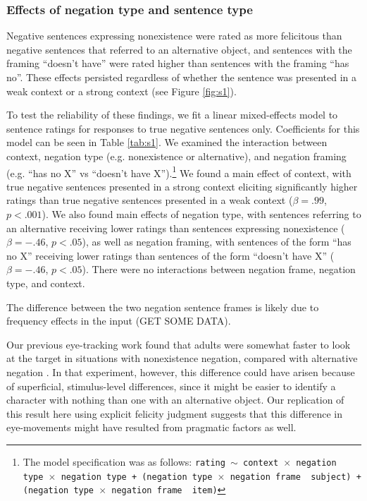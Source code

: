 \documentclass[10pt,letterpaper]{article}
\begin{document}
\subsubsection{Effects of negation type and sentence type}

Negative sentences expressing nonexistence were rated as more felicitous than negative sentences that referred to an alternative object, and sentences with the framing ``doesn't have'' were rated higher than sentences with the framing ``has no''.  These effects persisted regardless of whether the sentence was presented in a weak context or a strong context (see Figure \ref{fig:s1}).  

To test the reliability of these findings, we fit a linear mixed-effects model to sentence ratings for responses to true negative sentences only.  Coefficients for this model can be seen in Table \ref{tab:s1}.  We examined the interaction between context, negation type (e.g. nonexistence or alternative), and negation framing (e.g. ``has no X'' vs ``doesn't have X'').\footnote{ The model specification was as follows: \texttt{rating $\sim$ context~$\times$~negation type~$\times$~negation type + (negation type~$\times$~negation frame~\textbar~subject) +  (negation type~$\times$~negation frame~\textbar~item)}} We found a main effect of context, with true negative sentences presented in a strong context eliciting significantly higher ratings than true negative sentences presented in a weak context ($\beta= .99$, $p< .001$).  We also found main effects of negation type, with sentences referring to an alternative receiving lower ratings than sentences expressing nonexistence ($\beta= -.46$, $p< .05$), as well as negation framing, with sentences of the form ``has no X'' receiving lower ratings than sentences of the form ``doesn't have X''  ($\beta= -.46$, $p< .05$).  There were no interactions between negation frame, negation type, and context.  

The difference between the two negation sentence frames is likely due to frequency effects in the input (GET SOME DATA). 

Our previous eye-tracking work found that adults were somewhat faster to look at the target in situations with nonexistence negation, compared with alternative negation \cite{nordmeyer2014b}. In that experiment, however, this difference could have arisen because of superficial, stimulus-level differences, since it might be easier to identify a character with nothing than one with an alternative object. Our replication of this result here using explicit felicity judgment suggests that this difference in eye-movements might have resulted from pragmatic factors as well. 
\end{document}
